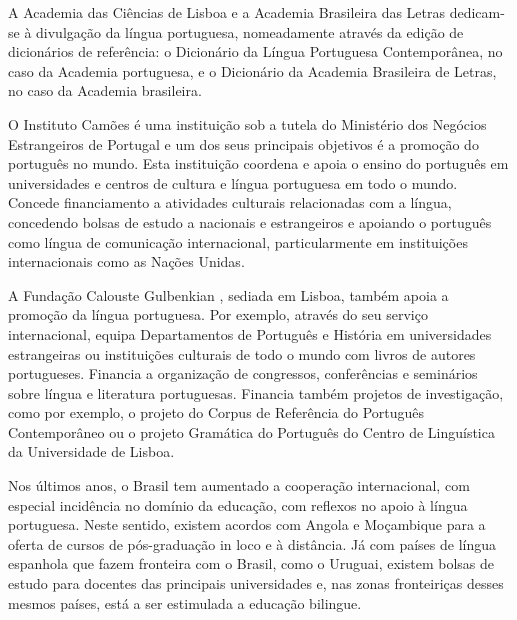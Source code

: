 \begin{multicols}{2}

A Academia das Ciências de Lisboa e a Academia Brasileira das Letras dedicam-se à divulgação da língua portuguesa, nomeadamente através da edição de dicionários
de referência: o Dicionário da Língua Portuguesa Contemporânea, no caso da Academia portuguesa, e o Dicionário da Academia Brasileira de Letras, no caso da Academia brasileira. 

O Instituto Camões é uma instituição sob a tutela do Ministério dos Negócios Estrangeiros de Portugal e um dos seus principais objetivos 
é a promoção do português no mundo. 
Esta instituição coordena e apoia o ensino do português em universidades e centros de cultura e língua portuguesa em todo o mundo.
Concede financiamento a atividades culturais relacionadas com a língua, concedendo bolsas 
de estudo a nacionais e estrangeiros e apoiando o português como língua de comunicação internacional, particularmente em instituições internacionais como as Nações Unidas. 


A Fundação Calouste Gulbenkian \cite{gulbenkian}, sediada em Lisboa, também apoia a promoção da língua portuguesa. 
Por exemplo, através do seu serviço internacional, equipa Departamentos de Português e História em universidades estrangeiras ou instituições culturais
de todo o mundo com livros de autores portugueses. 
Financia a organização de congressos, conferências e seminários sobre língua e literatura portuguesas. 
Financia também projetos de investigação, como por exemplo, o projeto do Corpus de Referência do Português Contemporâneo ou o projeto Gramática do Português do Centro de Linguística da Universidade de Lisboa.

Nos últimos anos, o Brasil tem aumentado a cooperação internacional, com especial incidência no domínio da educação, com reflexos
no apoio à língua portuguesa. Neste sentido, existem acordos com Angola e Moçambique para a oferta de cursos de pós-graduação in loco e à distância. Já com países de língua espanhola que fazem fronteira com o Brasil, como o Uruguai, existem bolsas de estudo para docentes das principais universidades e, nas zonas fronteiriças desses mesmos países, está a ser es\-ti\-mu\-la\-da a educação bilingue.


\end{multicols}
